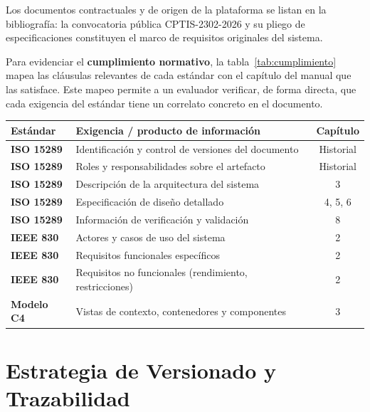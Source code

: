 Los documentos contractuales y de origen de la plataforma se listan en la bibliografía:
la convocatoria pública CPTIS-2302-2026 y su pliego de especificaciones constituyen el
marco de requisitos originales del sistema.

Para evidenciar el \textbf{cumplimiento normativo}, la tabla~\ref{tab:cumplimiento}
mapea las cláusulas relevantes de cada estándar con el capítulo del manual que las
satisface. Este mapeo permite a un evaluador verificar, de forma directa, que cada
exigencia del estándar tiene un correlato concreto en el documento.

\vspace{0.2cm}
\noindent
\renewcommand{\arraystretch}{1.35}
\fontsize{9}{10.8}\selectfont\sffamily
\begin{tabularx}{\textwidth}{|>{\bfseries\color{colorPrimario}}l|X|c|}
\hline
\rowcolor{headerTabla}
\textbf{Estándar} & \textbf{Exigencia / producto de información} & \textbf{Capítulo} \\
\hline
ISO 15289 & Identificación y control de versiones del documento & Historial \\
\hline
\rowcolor{grisTecnico}
ISO 15289 & Roles y responsabilidades sobre el artefacto & Historial \\
\hline
ISO 15289 & Descripción de la arquitectura del sistema & 3 \\
\hline
\rowcolor{grisTecnico}
ISO 15289 & Especificación de diseño detallado & 4, 5, 6 \\
\hline
ISO 15289 & Información de verificación y validación & 8 \\
\hline
\rowcolor{grisTecnico}
IEEE 830 & Actores y casos de uso del sistema & 2 \\
\hline
IEEE 830 & Requisitos funcionales específicos & 2 \\
\hline
\rowcolor{grisTecnico}
IEEE 830 & Requisitos no funcionales (rendimiento, restricciones) & 2 \\
\hline
Modelo C4 & Vistas de contexto, contenedores y componentes & 3 \\
\hline
\end{tabularx}
\label{tab:cumplimiento}

\section{Estrategia de Versionado y Trazabilidad}
\label{sec:versionado}

